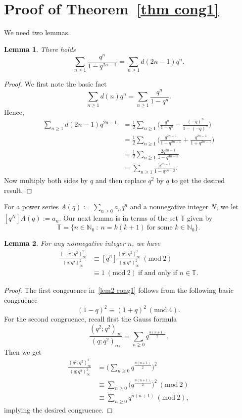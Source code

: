 \documentclass[reqno]{amsart}
\theoremstyle{definition}
\theoremstyle{plain}
\newtheorem{lemma}      {Lemma}
\theoremstyle{remark}
\numberwithin{equation}{section}
\newcommand{\Mod}[1]{\ (\mathrm{mod}\ #1)}
\newcommand{\fr}{\frac}
\begin{document}
\section{Proof of Theorem~\ref{thm cong1}}\label{sec proof cong1}
%
We need two lemmas.
\begin{lemma}\label{lem1 cong1}
There holds
\[
\sum_{n\geq 1}\fr{q^n}{1-q^{2n-1}} = \sum_{n\geq 1} d(2n-1)q^n.
\]
\end{lemma}
\begin{proof}
We first note the basic fact
\[
\sum_{n\geq 1}d(n) q^{n} = \sum_{n\geq 1}\fr{q^n}{1-q^n}.
\]
Hence,
\begin{align*}
\sum_{n\geq 1} d(2n-1)q^{2n-1} &= \fr{1}{2} \sum_{n\geq 1}\Big(\fr{q^n}{1-q^n}-\fr{(-q)^n}{1-(-q)^n}\Big) \\
&=\fr{1}{2} \sum_{n\geq 1}\Big(\fr{q^{2n-1}}{1-q^{2n-1}}+\fr{q^{2n-1}}{1+q^{2n-1}}\Big) \\
&=\fr{1}{2} \sum_{n\geq 1} \fr{2q^{2n-1}}{1-q^{4n-2}} \\
&=\sum_{n\geq 1}\fr{q^{2n-1}}{1-q^{4n-2}}.
\end{align*}
Now multiply both sides by $q$ and then replace $q^2$ by $q$ to get the desired result.
\end{proof}
%
For a power series $A(q):= \sum_{n\geq 0}a_n q^n$
and a nonnegative integer $N$, we let $[q^N]A(q):= a_n$.
Our next lemma is in terms of the set $\mathbb{T}$ given by
\[
\mathbb{T} =\{ n\in\mathbb{N}_0\ :\ n=k(k+1)\ \text{for some $k\in\mathbb{N}_0$} \}.
\]
\begin{lemma}\label{lem2 cong1}
For any nonnegative integer $n$, we have
\begin{align*}
[q^n]\fr{(-q^2;q^2)_\infty^2}{(q;q^2)_\infty^2} &\equiv [q^n]\fr{(q^2;q^2)_\infty^2}{(q;q^2)_\infty^2} \Mod{2} \\
&\equiv 1\Mod{2}\ \text{if and only if $n\in\mathbb{T}$.}
\end{align*}
\end{lemma}
\begin{proof}
The first congruence in~\eqref{lem2 cong1} follows from the following basic congruence
\begin{equation}\label{basic-cong}
(1-q)^2\equiv (1+q)^2\Mod{4}.
\end{equation}
For the second congruence, recall first the Gauss formula~\cite[(2.2.13)]{Andrews}
\begin{equation}\label{Gauss}
\fr{(q^2;q^2)_\infty}{(q;q^2)_\infty} = \sum_{n\geq 0} q^{\fr{n(n+1)}{2}}.
\end{equation}
Then we get
\begin{align*}
\fr{(q^2;q^2)_\infty^2}{(q;q^2)_\infty^2} &= \Big(\sum_{n\geq 0} q^{\fr{n(n+1)}{2}} \Big)^2 \\
&\equiv \sum_{n\geq 0} \big(q^{\fr{n(n+1)}{2}} \big)^2 \Mod{2} \\
&\equiv \sum_{n\geq 0} q^{n(n+1)} \Mod{2},
\end{align*}
implying the desired congruence.
\end{proof}
\end{document}
